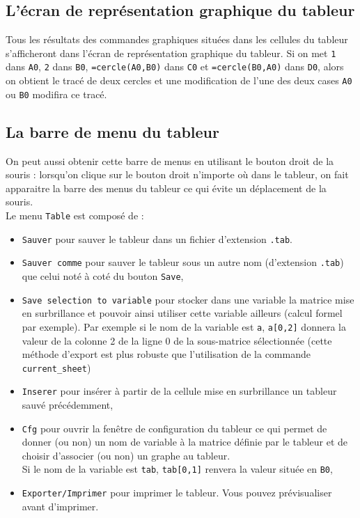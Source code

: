 \documentclass[a4paper,11pt]{article}
\begin{document}
\subsection{L'\'ecran de repr\'esentation graphique du tableur}
Tous les r\'esultats des commandes graphiques situ\'ees dans les cellules du 
tableur s'afficheront dans l'\'ecran de repr\'esentation graphique du tableur.
Si on met {\tt 1} dans {\tt A0},
{\tt 2} dans {\tt B0}, {\tt =cercle(A0,B0)} dans {\tt C0} et 
{\tt =cercle(B0,A0)}
 dans {\tt D0}, alors on obtient le trac\'e de deux cercles et une modification
de l'une des deux cases {\tt A0} ou {\tt B0} modifira ce trac\'e. 


\subsection{La barre de menu du tableur}
On peut aussi obtenir cette barre de menus en utilisant le bouton droit de la 
souris : lorsqu'on clique sur le bouton droit n'importe o\`u dans le tableur, 
on fait apparaitre la barre des menus du tableur ce qui \'evite un 
d\'eplacement de la souris.\\
Le menu {\tt Table} est compos\'e de :
\begin{itemize}
\item {\tt Sauver} pour sauver le tableur dans un fichier d'extension 
{\tt .tab}.
\item {\tt Sauver comme}  pour sauver le tableur sous un autre nom (d'extension
{\tt .tab}) que celui not\'e \`a cot\'e du bouton {\tt Save},
\item {\tt Save selection to variable} pour stocker dans une variable
 la matrice mise en surbrillance et pouvoir ainsi utiliser cette variable 
ailleurs (calcul formel par exemple). Par exemple si le nom de la variable est
{\tt a}, {\tt a[0,2]} donnera la valeur de la colonne 2 de la 
ligne 0 de la sous-matrice s\'electionn\'ee
(cette m\'ethode d'export est plus robuste que l'utilisation de 
la commande {\tt current\_sheet})
\item {\tt Inserer} pour ins\'erer 
\`a partir de la cellule mise en surbrillance 
un tableur sauv\'e pr\'ec\'edemment,
\item {\tt Cfg} pour ouvrir la fen\^etre de configuration du tableur ce qui 
permet de donner (ou non) un nom de variable \`a la matrice d\'efinie par le 
tableur et de choisir d'associer (ou non) un graphe au tableur.\\
Si le nom de la variable est {\tt tab}, {\tt tab[0,1]} renvera la valeur 
situ\'ee en {\tt B0},
\item {\tt Exporter/Imprimer} pour imprimer le tableur. Vous pouvez 
pr\'evisualiser avant d'imprimer.
\end{itemize}
\end{document}
